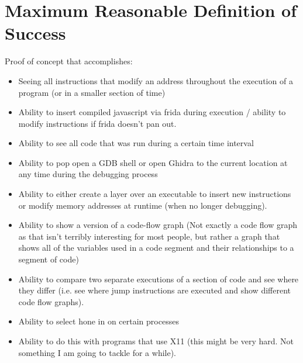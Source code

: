 \section{Maximum Reasonable Definition of Success}
Proof of concept that accomplishes:
\begin{itemize}
    \item Seeing all instructions that modify an address throughout the execution of a program (or in a smaller section of time)
    \item Ability to insert compiled javascript via frida during execution / ability to modify instructions if frida doesn't pan out. 
    \item Ability to see all code that was run during a certain time interval
    \item Ability to pop open a GDB shell or open Ghidra to the current location at any time during the debugging process
    \item Ability to either create a layer over an executable to insert new instructions or modify memory addresses at runtime (when no longer debugging). 
    \item Ability to show a version of a code-flow graph (Not exactly a code flow graph as that isn't terribly interesting for most people, but rather a graph that shows all of the variables used in a code segment and their relationships to a segment of code)
    \item Ability to compare two separate executions of a section of code and see where they differ (i.e. see where jump instructions are executed and show different code flow graphs). 
    \item Ability to select hone in on certain processes
    \item Ability to do this with programs that use X11 (this might be very hard. Not something I am going to tackle for a while). 
\end{itemize}

